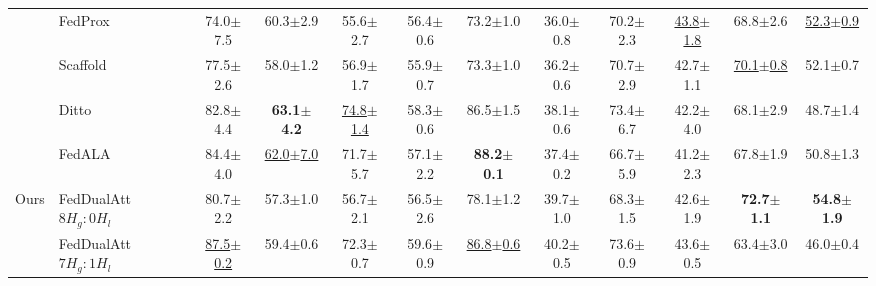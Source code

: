 \documentclass[conference]{IEEEtran}
\begin{document}
{\begin{table}[!t]
\begin{tabular}{|c|l|cc|cc|cc|cc|cc|}
    & FedProx & 74.0{\scriptsize$\pm$7.5} & 60.3{\scriptsize$\pm$2.9} & 55.6{\scriptsize$\pm$2.7} & 56.4{\scriptsize$\pm$0.6} & 73.2{\scriptsize$\pm$1.0} & 36.0{\scriptsize$\pm$0.8} & 70.2{\scriptsize$\pm$2.3} & \underline{43.8{\scriptsize$\pm$1.8}} & 68.8{\scriptsize$\pm$2.6} & \underline{52.3{\scriptsize$\pm$0.9}} \\
    & Scaffold & 77.5{\scriptsize$\pm$2.6} & 58.0{\scriptsize$\pm$1.2} & 56.9{\scriptsize$\pm$1.7} & 55.9{\scriptsize$\pm$0.7} & 73.3{\scriptsize$\pm$1.0} & 36.2{\scriptsize$\pm$0.6} & 70.7{\scriptsize$\pm$2.9} & 42.7{\scriptsize$\pm$1.1} & \underline{70.1{\scriptsize$\pm$0.8}} & 52.1{\scriptsize$\pm$0.7} \\
    & Ditto   & 82.8{\scriptsize$\pm$4.4} & \textbf{63.1{\scriptsize$\pm$4.2}} & \underline{74.8{\scriptsize$\pm$1.4}} & 58.3{\scriptsize$\pm$0.6} & 86.5{\scriptsize$\pm$1.5} & 38.1{\scriptsize$\pm$0.6} & 73.4{\scriptsize$\pm$6.7} & 42.2{\scriptsize$\pm$4.0} & 68.1{\scriptsize$\pm$2.9} & 48.7{\scriptsize$\pm$1.4} \\
    & FedALA  & 84.4{\scriptsize$\pm$4.0} & \underline{62.0{\scriptsize$\pm$7.0}} & 71.7{\scriptsize$\pm$5.7} & 57.1{\scriptsize$\pm$2.2} & \textbf{88.2{\scriptsize$\pm$0.1}} & 37.4{\scriptsize$\pm$0.2} & 66.7{\scriptsize$\pm$5.9} & 41.2{\scriptsize$\pm$2.3} & 67.8{\scriptsize$\pm$1.9} & 50.8{\scriptsize$\pm$1.3} \\
    \hline
    \multirow{9}{*}{Ours} & FedDualAtt $8H_g\!:\!0H_l$ & 80.7{\scriptsize$\pm$2.2} & 57.3{\scriptsize$\pm$1.0} & 56.7{\scriptsize$\pm$2.1} & 56.5{\scriptsize$\pm$2.6} & 78.1{\scriptsize$\pm$1.2} & 39.7{\scriptsize$\pm$1.0} & 68.3{\scriptsize$\pm$1.5} & 42.6{\scriptsize$\pm$1.9} & \textbf{72.7{\scriptsize$\pm$1.1}} & \textbf{54.8{\scriptsize$\pm$1.9}} \\
    & FedDualAtt $7H_g\!:\!1H_l$ & \underline{87.5{\scriptsize$\pm$0.2}} & 59.4{\scriptsize$\pm$0.6} & 72.3{\scriptsize$\pm$0.7} & 59.6{\scriptsize$\pm$0.9} & \underline{86.8{\scriptsize$\pm$0.6}} & 40.2{\scriptsize$\pm$0.5} & 73.6{\scriptsize$\pm$0.9} & 43.6{\scriptsize$\pm$0.5} & 63.4{\scriptsize$\pm$3.0} & 46.0{\scriptsize$\pm$0.4} \\

\end{tabular}
\end{table}}
\end{document}
